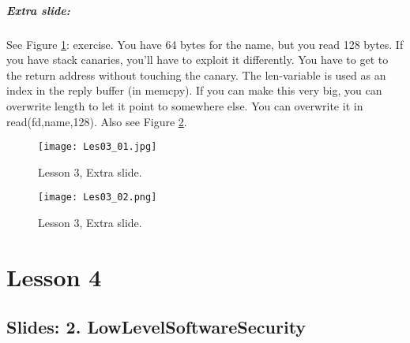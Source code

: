 \documentclass[10pt,a4paper]{report}
\begin{document}
\paragraph{Extra slide:} See Figure \ref{les03_01}: exercise. You have 64 bytes for the name, but you read 128 bytes. If you have stack canaries, you'll have to exploit it differently. You have to get to the return address without touching the canary. The len-variable is used as an index in the reply buffer (in memcpy). If you can make this very big, you can overwrite length to let it point to somewhere else. You can overwrite it in read(fd,name,128). Also see Figure \ref{les03_02}. 

\begin{figure}[ht!]
\centering
\texttt{[image: Les03\_01.jpg]}
\caption{Lesson 3, Extra slide.} 
\label{les03_01}
\end{figure}

\begin{figure}[ht!]
\centering
\texttt{[image: Les03\_02.png]}
\caption{Lesson 3, Extra slide.} 
\label{les03_02}
\end{figure}

\chapter{Lesson 4}
\section{Slides: 2. LowLevelSoftwareSecurity}
\end{document}
